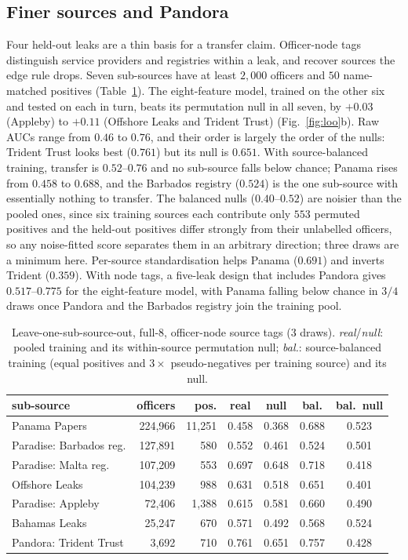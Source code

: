 \documentclass[11pt]{article}
\begin{document}
\subsection{Finer sources and Pandora}\label{sec:res-sub}
Four held-out leaks are a thin basis for a transfer claim. Officer-node tags
distinguish service providers and registries within a leak, and recover sources
the edge rule drops. Seven sub-sources have at least $2{,}000$ officers and $50$
name-matched positives (Table~\ref{tab:sub}). The eight-feature model, trained on
the other six and tested on each in turn, beats its permutation null in all seven,
by $+0.03$ (Appleby) to $+0.11$ (Offshore Leaks and Trident Trust)
(Fig.~\ref{fig:loo}b). Raw AUCs range from $0.46$ to $0.76$, and their order is
largely the order of the nulls: Trident Trust looks best ($0.761$) but its null is
$0.651$. With source-balanced training, transfer is $0.52$--$0.76$ and no
sub-source falls below chance; Panama rises from $0.458$ to $0.688$, and the
Barbados registry ($0.524$) is the one sub-source with essentially nothing to
transfer. The balanced nulls ($0.40$--$0.52$) are noisier than the pooled ones, since
six training sources each contribute only $553$ permuted positives and the held-out
positives differ strongly from their unlabelled officers, so any noise-fitted score
separates them in an arbitrary direction; three draws are a minimum here. Per-source standardisation helps Panama ($0.691$) and inverts Trident
($0.359$). With node tags, a five-leak design that includes Pandora gives
$0.517$--$0.775$ for the eight-feature model, with Panama falling below chance in
$3/4$ draws once Pandora and the Barbados registry join the training pool.

\begin{table}[t]\centering\small\setlength{\tabcolsep}{3pt}
\begin{tabular}{lrrcccc}
\toprule
sub-source & officers & pos. & real & null & bal. & bal.\ null\\
\midrule
Panama Papers & 224{,}966 & 11{,}251 & 0.458 & 0.368 & 0.688 & 0.523\\
Paradise: Barbados reg. & 127{,}891 & 580 & 0.552 & 0.461 & 0.524 & 0.501\\
Paradise: Malta reg. & 107{,}209 & 553 & 0.697 & 0.648 & 0.718 & 0.418\\
Offshore Leaks & 104{,}239 & 988 & 0.631 & 0.518 & 0.651 & 0.401\\
Paradise: Appleby & 72{,}406 & 1{,}388 & 0.615 & 0.581 & 0.660 & 0.490\\
Bahamas Leaks & 25{,}247 & 670 & 0.571 & 0.492 & 0.568 & 0.524\\
Pandora: Trident Trust & 3{,}692 & 710 & 0.761 & 0.651 & 0.757 & 0.428\\
\bottomrule
\end{tabular}
\caption{Leave-one-sub-source-out, full-8, officer-node source tags (3 draws).
\emph{real}/\emph{null}: pooled training and its within-source permutation null;
\emph{bal.}: source-balanced training (equal positives and $3\times$ pseudo-negatives
per training source) and its null.}\label{tab:sub}\end{table}
\end{document}
